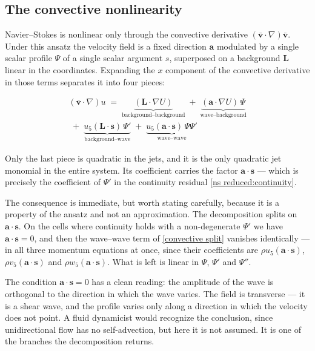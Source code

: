 \documentclass{article}
\theoremstyle{definition}
\theoremstyle{plain}
\begin{document}
\begin{nsexample}
\subsection{The convective nonlinearity}

Navier--Stokes is nonlinear only through the convective derivative
$(\mathbf{\bar{v}}\cdot\nabla)\mathbf{\bar{v}}$.  Under this ansatz the velocity
field is a fixed direction $\mathbf{a}$ modulated by a single scalar profile
$\Psi$ of a single scalar argument $s$, superposed on a background $\mathbf{L}$
linear in the coordinates.  Expanding the $x$ component of the convective
derivative in those terms separates it into four pieces:

\begin{equation}
\label{convective split}
\begin{gathered}
(\mathbf{\bar{v}}\cdot\nabla)u \;=\;
\underbrace{(\mathbf{L}\cdot\nabla U)}_{\text{background--background}}
\;+\; \underbrace{(\mathbf{a}\cdot\nabla U)\,\Psi}_{\text{wave--background}} \\[6pt]
{} \;+\; \underbrace{u_5(\mathbf{L}\cdot\mathbf{s})\,\Psi'}_{\text{background--wave}}
\;+\; \underbrace{u_5(\mathbf{a}\cdot\mathbf{s})\,\Psi\Psi'}_{\text{wave--wave}}
\end{gathered}
\end{equation}

Only the last piece is quadratic in the jets, and it is the only quadratic jet
monomial in the entire system.  Its coefficient carries the factor
$\mathbf{a}\cdot\mathbf{s}$ --- which is precisely the coefficient of $\Psi'$
in the continuity residual \eqref{ns reduced:continuity}.

The consequence is immediate, but worth stating carefully, because it is a
property of the ansatz and not an approximation.  The decomposition splits on
$\mathbf{a}\cdot\mathbf{s}$.  On the cells where continuity holds with a
non-degenerate $\Psi'$ we have $\mathbf{a}\cdot\mathbf{s} = 0$, and then the
wave--wave term of \eqref{convective split} vanishes identically --- in all
three momentum equations at once, since their coefficients are
$\rho u_5 (\mathbf{a}\cdot\mathbf{s})$, $\rho v_5 (\mathbf{a}\cdot\mathbf{s})$
and $\rho w_5 (\mathbf{a}\cdot\mathbf{s})$.  What is left is linear in
$\Psi$, $\Psi'$ and $\Psi''$.

The condition $\mathbf{a}\cdot\mathbf{s} = 0$ has a clean reading: the amplitude
of the wave is orthogonal to the direction in which the wave varies.  The field
is transverse --- it is a shear wave, and the profile varies only along a
direction in which the velocity does not point.  A fluid dynamicist would
recognize the conclusion, since unidirectional flow has no self-advection, but
here it is not assumed.  It is one of the branches the decomposition returns.


\end{nsexample}
\end{document}
